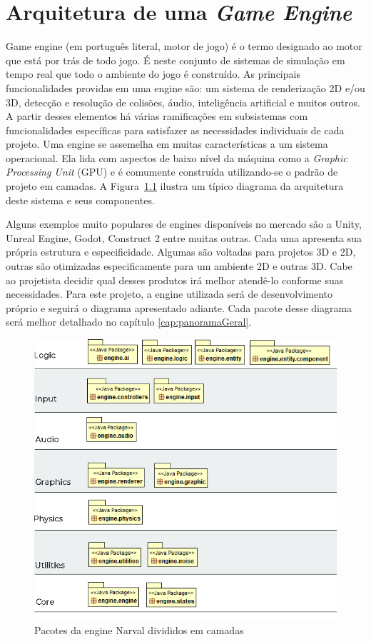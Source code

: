 \documentclass[12pt, 
openright, 
oneside, 
a4paper,    
brazil]{facom-ufu-abntex2}
\begin{document}
\chapter{Arquitetura de uma \textit{Game Engine}}
\label{cap:gameEngine}
Game engine (em português literal, motor de jogo) é o termo designado ao motor que está por trás de todo jogo. É neste conjunto de sistemas de simulação em tempo real que todo o ambiente do jogo é construído. As principais funcionalidades providas em uma engine são: um sistema de renderização 2D e/ou 3D, detecção e resolução de colisões, áudio, inteligência artificial e muitos outros. A partir desses elementos há várias ramificações em subsistemas com funcionalidades específicas para satisfazer as necessidades individuais de cada projeto. Uma engine se assemelha em muitas características a um sistema operacional. Ela lida com aspectos de baixo nível da máquina como a \textit{Graphic Processing Unit} (GPU) e é comumente construída utilizando-se o padrão de projeto em camadas. A Figura~\ref{fig:arquitetura}  ilustra um típico diagrama da arquitetura deste sistema e seus componentes.

Alguns exemplos muito populares de engines disponíveis no mercado são a Unity, Unreal Engine, Godot, Construct 2 entre muitas outras. Cada uma apresenta sua própria estrutura e especificidade. Algumas são voltadas para projetos 3D e 2D, outras são otimizadas especificamente para um ambiente 2D e outras 3D. Cabe ao projetista decidir qual desses produtos irá melhor atendê-lo conforme suas necessidades. Para este projeto, a engine utilizada será de desenvolvimento próprio e seguirá o diagrama apresentado adiante. Cada pacote desse diagrama será melhor detalhado no capítulo \ref{cap:panoramaGeral}.




\begin{figure}[H]
	\centering
	\includegraphics[width=\textwidth]{imagens/engineLayers.png}
	\caption{Pacotes da engine Narval divididos em camadas
    \label{fig:arquitetura}}
\end{figure}
\end{document}
